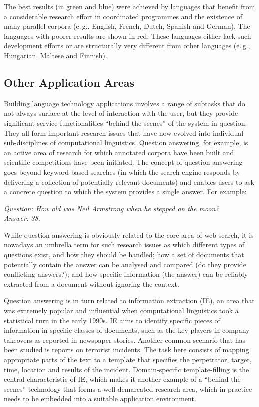 \documentclass[]{../../metanetpaper}
\begin{document}
\begin{multicols}{2}
The best results (in green and blue) were achieved by languages that benefit from a considerable research effort in coordinated programmes and the existence of many parallel corpora (e.\,g., English, French, Dutch, Spanish and German). The languages with poorer results are shown in red. These languages either lack such development efforts or are structurally very different from other languages (e.\,g., Hungarian, Maltese and Finnish).

\subsection{Other Application Areas}

Building language technology applications involves a range of subtasks that do not always surface at the level of interaction with the user, but they provide significant service functionalities “behind the scenes” of the system in question. They all form important research issues that have now evolved into individual sub-disciplines of computational linguistics.  Question answering, for example, is an active area of research for which annotated corpora have been built and scientific competitions have been initiated. The concept of question answering goes beyond keyword-based searches (in which the search engine responds by delivering a collection of potentially relevant documents) and enables users to ask a concrete question to which the system provides a single answer. For example:

\textit{Question: How old was Neil Armstrong when he stepped on the moon?}\\
\textit{Answer: 38.}

While question answering is obviously related to the core area of web search, it is nowadays an umbrella term for such research issues as which different types of questions exist, and how they should be handled; how a set of documents that potentially contain the answer can be analysed and compared (do they provide conflicting answers?); and how specific information (the answer) can be reliably extracted from a document without ignoring the context. 


Question answering is in turn related to information extraction (IE), an area that was extremely popular and influential when computational linguistics took a statistical turn in the early 1990s. IE aims to identify specific pieces of information in specific classes of documents, such as the key players in company takeovers as reported in newspaper stories. Another common scenario that has been studied is reports on terrorist incidents. The task here consists of mapping appropriate parts of the text to a template that specifies the perpetrator, target, time, location and results of the incident. Domain-specific template-filling is the central characteristic of IE, which makes it another example of a “behind the scenes” technology that forms a well-demarcated research area, which in practice needs to be embedded into a suitable application environment. 


\end{multicols}
\end{document}
